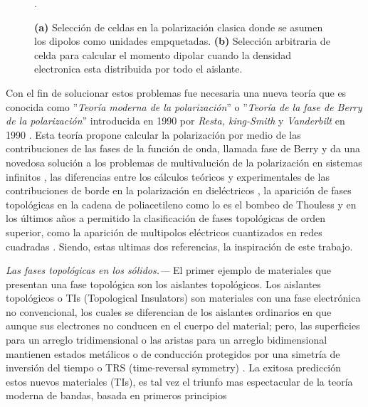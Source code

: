 \begin{figure}[h!]
\begin{subfigure}[b!]{0.3 \textwidth}
    \end{subfigure}\hspace*{1em} \vspace*{0.5em}
       \caption{\textbf{(a)} Selección de celdas en la polarización clasica donde se asumen los dipolos como unidades empquetadas. \textbf{(b)} Selección arbitraria de celda para calcular el momento dipolar cuando la densidad electronica esta distribuida por todo el aislante.}.
       \label{fig:cell_selection}
\end{figure}

Con el fin de solucionar estos problemas fue necesaria una nueva teoría que es conocida como ''\textit{Teoría moderna de la polarización}'' o ''\textit{Teoría de la fase de Berry de la polarización}'' introducida en 1990 por \textit{Resta, king-Smith} y \textit{Vanderbilt} en 1990 . Esta teoría propone calcular la polarización por medio de las contribuciones de las fases de la función de onda, llamada fase de Berry y da una novedosa solución a los problemas de multivalución de la polarización en sistemas infinitos \cite{spaldin2012beginner}, las diferencias entre los cálculos teóricos y experimentales de las contribuciones de borde en la polarización en dieléctricos \cite{rabe2007modern}, la aparición de fases topológicas en la cadena de poliacetileno como lo es el bombeo de Thouless  y en los últimos años a permitido la clasificación de fases topológicas de orden superior, como la aparición de multipolos eléctricos cuantizados en redes cuadradas \cite{Benalcazar2017}. Siendo, estas ultimas dos referencias, la inspiración de este trabajo.  


{\it Las fases topológicas en los sólidos.---} El primer ejemplo de materiales que presentan una fase topológica son los aislantes topológicos. Los aislantes topológicos o TIs (Topological Insulators) son materiales con una fase electrónica no convencional, los cuales se diferencian de los aislantes ordinarios en que aunque sus electrones no conducen en el cuerpo del material; pero, las superficies para un arreglo tridimensional o las aristas para un arreglo bidimensional mantienen estados metálicos o de conducción protegidos por una simetría de inversión del tiempo o TRS (time-reversal symmetry) \cite{Shore2018}. La exitosa predicción estos nuevos materiales (TIs), es tal vez el triunfo mas espectacular de la teoría moderna de bandas, basada en primeros principios  

